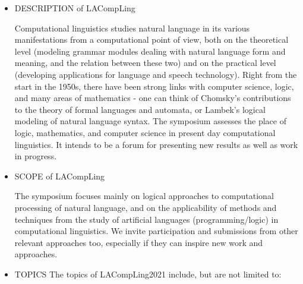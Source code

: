 \documentclass[prodmode,acmtecs]{acmsmall} %
\begin{document}
\begin{itemize}\item  DESCRIPTION of LACompLing 
 
  Computational linguistics studies natural language in its various manifestations from a computational point of view, both on the theoretical level (modeling grammar modules dealing with natural language form and meaning, and the relation between these two) and on the practical level (developing applications for language and speech technology). Right from the start in the 1950s, there have been strong links with computer science, logic, and many areas of mathematics - one can think of Chomsky's contributions to the theory of formal languages and automata, or Lambek's logical modeling of natural language syntax. The symposium assesses the place of logic, mathematics, and computer science in present day computational linguistics. It intends to be a forum for presenting new results as well as work in progress. 
 
\item  SCOPE of LACompLing 
 
  The symposium focuses mainly on logical approaches to computational processing of natural language, and on the applicability of methods and techniques from the study of artificial languages (programming/logic) in computational linguistics. We invite participation and submissions from other relevant approaches too, especially if they can inspire new work and approaches. 
 
\item  TOPICS The topics of LACompLing2021 include, but are not limited to: 
 

\end{itemize}
\end{document}
